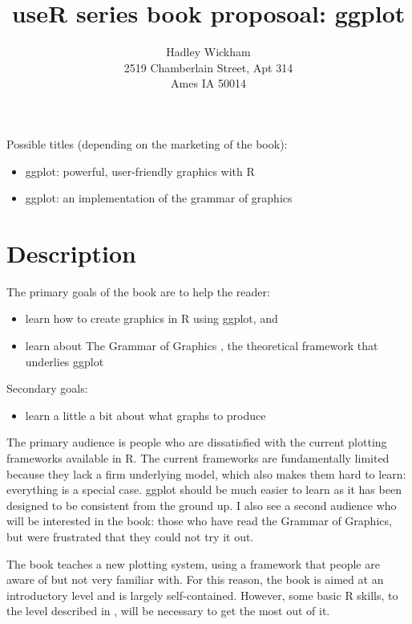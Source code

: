 \documentclass[oneside,letterpaper]{scrartcl}
\title{useR series book proposoal: ggplot}
\author{Hadley Wickham \\
\normalsize{2519 Chamberlain Street, Apt 314} \\
\normalsize{Ames IA 50014}
}
\begin{document}
\maketitle

Possible titles (depending on the marketing of the book):

\begin{itemize}
  \item ggplot: powerful, user-friendly graphics with R
  \item ggplot: an implementation of the grammar of graphics
\end{itemize}

\section{Description}\label{sec:description}


The primary goals of the book are to help the reader:

\begin{itemize}
  \item learn how to create graphics in R using ggplot, and
  \item learn about The Grammar of Graphics \citep{wilkinson:2006}, the theoretical framework that underlies ggplot
\end{itemize}

\noindent Secondary goals:

\begin{itemize}
  \item learn a little a bit about what graphs to produce
\end{itemize}

The primary audience is people who are dissatisfied with the current plotting frameworks available in R.  The current frameworks are fundamentally limited because they lack a firm underlying model, which also makes them hard to learn: everything is a special case.  ggplot should be much easier to learn as it has been designed to be consistent from the ground up.  I also see a second audience who will be interested in the book: those who have read the Grammar of Graphics, but were frustrated that they could not try it out.  

The book teaches a new plotting system, using a framework that people are aware of but not very familiar with.  For this reason, the book is aimed at an introductory level and is largely self-contained.  However, some basic R skills, to the level described in \citet{dalgaard:2002}, will be necessary to get the most out of it.
\end{document}
